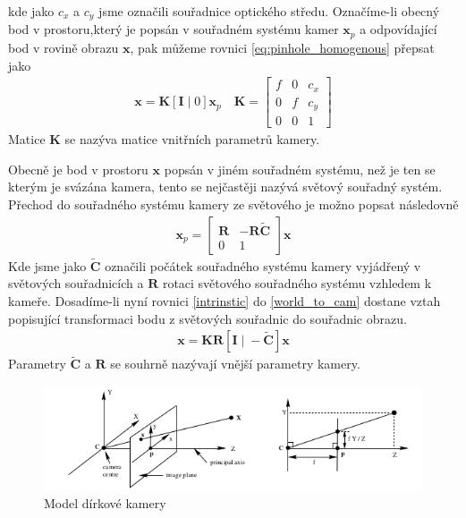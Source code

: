\documentclass[twoside]{ctuthesis}
\newcommand{\tl}[1]{$\mathbf{#1}$}
\begin{document}
kde jako $c_x$ a $c_y$ jsme označili souřadnice optického středu. Označíme-li obecný bod v prostoru,který je popsán v souřadném systému kamer \tl{x}$_p$ a odpovídající bod v rovině obrazu \tl{x}, pak můžeme rovnici \ref{eq:pinhole_homogenous} přepsat jako
\begin{align}
    \mathbf{x} = \mathbf{K}[\mathbf{I}\; |\; 0 ]\mathbf{x}_p \quad \mathbf{K} = \begin{bmatrix} f & 0 & c_x  \\ 0 & f & c_y  \\ 0 & 0 & 1  \end{bmatrix}
    \label{intrinstic}
\end{align}
Matice \tl{K} se nazýva matice vnitřních parametrů kamery.

Obecně je bod v prostoru $\mathbf{x}$ popsán v jiném souřadném systému, než je ten se kterým je svázána kamera, tento se nejčastěji nazývá světový souřadný systém. Přechod do souřadného systému kamery ze světového je možno popsat následovně 
\begin{align} 
    \mathbf{x}_p = \begin{bmatrix} \mathbf{R} & -\mathbf{R\tilde C} \\ 0 & 1 \end{bmatrix}
    \mathbf{x}
    \label{world_to_cam}
\end{align}
Kde jsme jako $\tilde{\mathbf{C}}$ označili počátek souřadného systému kamery vyjádřený v světových souřadnicích a \tl{R} rotaci světového souřadného systému vzhledem k kameře. Dosadíme-li nyní rovnici \ref{intrinstic} do \ref{world_to_cam} dostane vztah popisující transformaci bodu z světových souřadnic do souřadnic obrazu.
\begin{align}
    \mathbf{x} = \mathbf{KR}[\mathbf{I} \; | \; - \mathbf{\tilde C} ]\mathbf{x}
    \label{world_to_img}
\end{align}
Parametry $\mathbf{\tilde C}$ a \tl{R} se souhrně nazývají vnější parametry kamery. 
\begin{figure}
    \centering
    \includegraphics[width = 0.8\linewidth]{pictures/dirkovymodel_nakres.png}
    \caption{Model dírkové kamery}
    \label{pinhole}
\end{figure}
\end{document}
